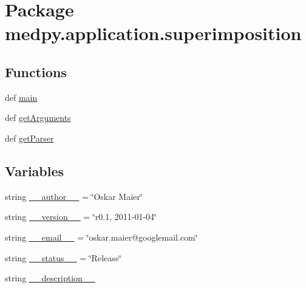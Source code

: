 \hypertarget{namespacemedpy_1_1application_1_1superimposition}{
\section{Package medpy.application.superimposition}
\label{namespacemedpy_1_1application_1_1superimposition}
}
\subsection*{Functions}
\begin{DoxyCompactItemize}
\item 
def \hyperlink{namespacemedpy_1_1application_1_1superimposition_aa14d1d88b9db1f39ab725fddb21dfcfb}{main}
\item 
def \hyperlink{namespacemedpy_1_1application_1_1superimposition_a269e42ee6805ffa3548490d4c0db37ee}{getArguments}
\item 
def \hyperlink{namespacemedpy_1_1application_1_1superimposition_aa4fc36f3c0409a74cd1573efd9fc9b9e}{getParser}
\end{DoxyCompactItemize}
\subsection*{Variables}
\begin{DoxyCompactItemize}
\item 
string \hyperlink{namespacemedpy_1_1application_1_1superimposition_a18a2daaf57afc7defd35222f30430a3a}{\_\-\_\-author\_\-\_\-} = \char`\"{}Oskar Maier\char`\"{}
\item 
string \hyperlink{namespacemedpy_1_1application_1_1superimposition_a291231d83ce38f1c37f24065032fced0}{\_\-\_\-version\_\-\_\-} = \char`\"{}r0.1, 2011-\/01-\/04\char`\"{}
\item 
string \hyperlink{namespacemedpy_1_1application_1_1superimposition_aaa1767ee709107508b4c5795c70a58d1}{\_\-\_\-email\_\-\_\-} = \char`\"{}oskar.maier@googlemail.com\char`\"{}
\item 
string \hyperlink{namespacemedpy_1_1application_1_1superimposition_a595c6def65b72f431dc9eea63293d5ae}{\_\-\_\-status\_\-\_\-} = \char`\"{}Release\char`\"{}
\item 
string \hyperlink{namespacemedpy_1_1application_1_1superimposition_ab45ada1106f654c856f65ae14bcb4a6e}{\_\-\_\-description\_\-\_\-}
\end{DoxyCompactItemize}


